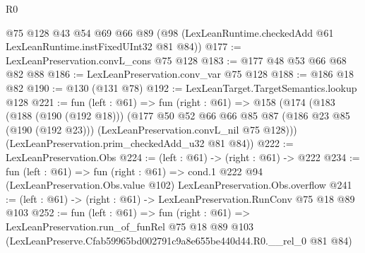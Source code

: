 \begin{lexlean}{R0}
\begin{coremodule}
    @75
    @128
    @43
    @54
    @69
    @66
    @89
    (@98 (LexLeanRuntime.checkedAdd @61 LexLeanRuntime.instFixedUInt32 @81 @84))
@177 := LexLeanPreservation.convL_cons @75 @128
@183 := @177 @48 @53 @66 @68 @82 @88
@186 := LexLeanPreservation.conv_var @75 @128
@188 := @186 @18 @82
@190 := @130 (@131 @78)
@192 := LexLeanTarget.TargetSemantics.lookup @128
@221 := fun (left : @61) =>
  fun (right : @61) =>
  @158
    (@174
      (@183
        (@188 (@190 (@192 @18)))
        (@177
          @50
          @52
          @66
          @66
          @85
          @87
          (@186 @23 @85 (@190 (@192 @23)))
          (LexLeanPreservation.convL_nil @75 @128)))
      (LexLeanPreservation.prim_checkedAdd_u32 @81 @84))
@222 := LexLeanPreservation.Obs
@224 := (left : @61) -> (right : @61) -> @222
@234 := fun (left : @61) =>
  fun (right : @61) =>
  cond.{1} @222 @94 (LexLeanPreservation.Obs.value @102) LexLeanPreservation.Obs.overflow
@241 := (left : @61) -> (right : @61) -> LexLeanPreservation.RunConv @75 @18 @89 @103
@252 := fun (left : @61) =>
  fun (right : @61) =>
  LexLeanPreservation.run_of_funRel
    @75
    @18
    @89
    @103
    (LexLeanPreserve.Cfab59965bd002791c9a8e655be440d44.R0.__rel_0 @81 @84)
\end{coremodule}
\end{lexlean}

